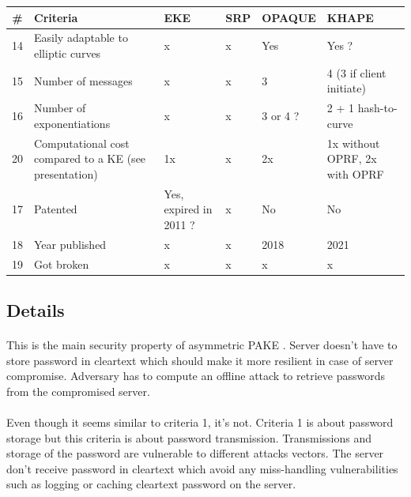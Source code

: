 \documentclass[../report.tex]{subfiles}
\begin{document}
\begin{center}
   \begin{tabular}{ | c | p{8cm} || p{1cm} | p{1cm} | p{2cm} | p{2cm} | }
     \hline
     \textbf{\#} & \textbf{Criteria} & \textbf{EKE} & \textbf{SRP} & \textbf{OPAQUE} & \textbf{KHAPE} \\ \hline
     
     14 & Easily adaptable to elliptic curves & x & x & Yes & Yes ? \\ \hline
     15 & Number of messages & x & x & 3 & 4 (3 if client initiate) \\ \hline
     16 & Number of exponentiations & x & x & 3 or 4 ? & 2 + 1 hash-to-curve \\ \hline
     20 & Computational cost compared to a KE (see \cite{KHAPE_Paper} presentation) & 1x & x & 2x & 1x without OPRF, 2x with OPRF \\ \hline
     17 & Patented & Yes, expired in 2011 ? & x & No & No \\ \hline
     18 & Year published & x & x & 2018 & 2021 \\ \hline
     19 & Got broken & x & x & x & x \\ \hline

     \end{tabular}
 \end{center}
 
\subsection{Details} \label{sec:comparison_details}



\paragraph{}
This is the main security property of asymmetric PAKE \cite{aPAKE_Formalized}. Server doesn't have to store password in cleartext which should make it more resilient in case of server compromise. Adversary has to compute an offline attack to retrieve passwords from the compromised server.

\paragraph{}
Even though it seems similar to criteria 1, it's not. Criteria 1 is about password storage but this criteria is about password transmission. Transmissions and storage of the password are vulnerable to different attacks vectors.
The server don't receive password in cleartext which avoid any miss-handling vulnerabilities such as logging or caching cleartext password on the server.
\end{document}
